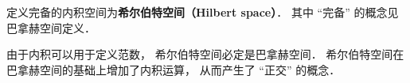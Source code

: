 
\begin{issues}
\issueDraft
\end{issues}


定义完备的内积空间为\textbf{希尔伯特空间（Hilbert space）}． 其中 “完备” 的概念见巴拿赫空间定义．

由于内积可以用于定义范数， 希尔伯特空间必定是巴拿赫空间． 希尔伯特空间在巴拿赫空间的基础上增加了内积运算， 从而产生了 “正交” 的概念．
